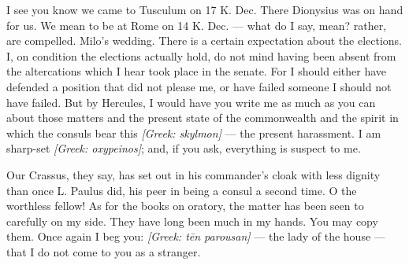 

 I see you know we came to Tusculum on 17 K. Dec. There Dionysius was on hand for us. We mean to be at Rome on 14 K. Dec. — what do I say, mean? rather, are compelled. Milo's wedding. There is a certain expectation about the elections. I, on condition the elections actually hold, do not mind having been absent from the altercations which I hear took place in the senate. For I should either have defended a position that did not please me, or have failed someone I should not have failed. But by Hercules, I would have you write me as much as you can about those matters and the present state of the commonwealth and the spirit in which the consuls bear this \textit{[Greek: skylmon]} — the present harassment. I am sharp-set \textit{[Greek: oxypeinos]}; and, if you ask, everything is suspect to me.

 Our Crassus, they say, has set out in his commander's cloak with less dignity than once L. Paulus did, his peer in being a consul a second time. O the worthless fellow! As for the books on oratory, the matter has been seen to carefully on my side. They have long been much in my hands. You may copy them. Once again I beg you: \textit{[Greek: tēn parousan]} — the lady of the house — that I do not come to you as a stranger.
